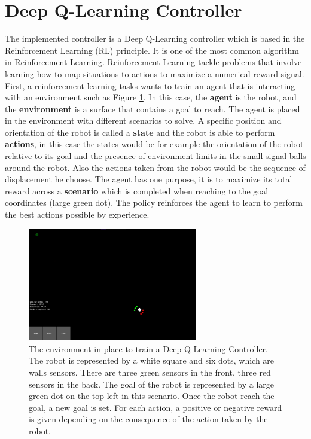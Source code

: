     \section{Deep Q-Learning Controller}
        The implemented controller is a Deep Q-Learning controller which is based in the Reinforcement Learning (RL) principle. It is one of the most common algorithm in Reinforcement Learning. Reinforcement Learning tackle problems that involve learning how to map situations to actions to maximize a numerical reward signal\cite{sutton_barto}. First, a reinforcement learning tasks wants to train an agent that is interacting with an environment such as Figure \ref{fig:arena}. In this case, the \textbf{agent} is the robot, and the \textbf{environment} is a surface that contains a goal to reach. The agent is placed in the environment with different scenarios to solve. A specific position and orientation of the robot is called a \textbf{state} and the robot is able to perform \textbf{actions}, in this case the states would be for example the orientation of the robot relative to its goal and the presence of environment limits in the small signal balls around the robot. Also the actions taken from the robot would be the sequence of displacement he choose. The agent has one purpose, it is to maximize its total reward across a \textbf{scenario} which is completed when reaching to the goal coordinates (large green dot). The policy reinforces the agent to learn to perform the best actions possible by experience. 
        
        \begin{figure}[h!]
            \centering
            \includegraphics[width=0.66\textwidth]{images/arena.png}
            \caption{The environment in place to train a Deep Q-Learning Controller. The robot is represented by a white square and six dots, which are walls sensors. There are three green sensors in the front, three red sensors in the back. The goal of the robot is represented by a large green dot on the top left in this scenario. Once the robot reach the goal, a new goal is set. For each action, a positive or negative reward is given depending on the consequence of the action taken by the robot.}
            \label{fig:arena}
        \end{figure}
        
